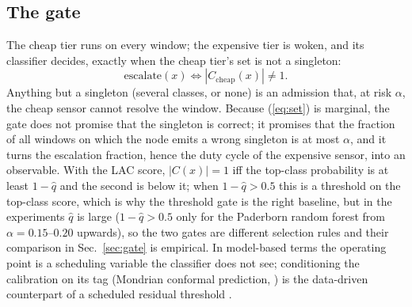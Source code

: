 \documentclass{ifacconf}
\begin{document}
\subsection{The gate}\label{sec:thegate}
The cheap tier runs on every window; the expensive tier is woken, and its classifier decides, exactly when the cheap tier's set is not a singleton:
\begin{equation}
\text{escalate}(x)\iff |C_{\text{cheap}}(x)|\ne 1.
\label{eq:gate}
\end{equation}
Anything but a singleton (several classes, or none) is an admission that, at risk $\alpha$, the cheap sensor cannot resolve the window. Because (\ref{eq:set}) is marginal, the gate does not promise that the singleton is correct; it promises that the fraction of all windows on which the node emits a wrong singleton is at most $\alpha$, and it turns the escalation fraction, hence the duty cycle of the expensive sensor, into an observable. With the LAC score, $|C(x)|=1$ iff the top-class probability is at least $1-\hat q$ and the second is below it; when $1-\hat q>0.5$ this is a threshold on the top-class score, which is why the threshold gate is the right baseline, but in the experiments $\hat q$ is large ($1-\hat q>0.5$ only for the Paderborn random forest from $\alpha=0.15$--$0.20$ upwards), so the two gates are different selection rules and their comparison in Sec.~\ref{sec:gate} is empirical. In model-based terms the operating point is a scheduling variable the classifier does not see; conditioning the calibration on its tag (Mondrian conformal prediction, \citealp{vovk2005}) is the data-driven counterpart of a scheduled residual threshold \citep{isermann2006}.
\end{document}
